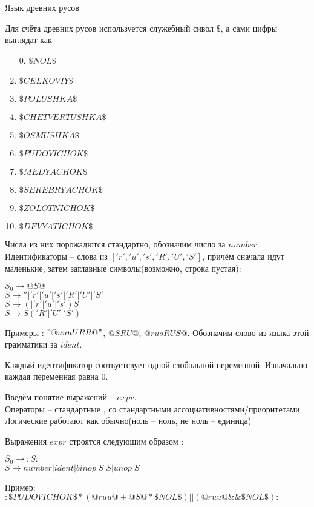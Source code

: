 \documentclass[12pt]{article}
\begin{document}
\begin{center} {\LARGE Язык древних русов} \end{center}

\bigskip


Для счёта древних русов используется служебный сивол $\$$, а сами цифры выглядат как
\begin{enumerate}
\item[0.] $\$NOL\$$
\item $\$CELKOVIY\$$
\item $\$POLUSHKA\$$
\item $\$CHETVERTUSHKA\$$
\item $\$OSMUSHKA\$$
\item $\$PUDOVICHOK\$$
\item $\$MEDYACHOK\$$
\item $\$SEREBRYACHOK\$$
\item $\$ZOLOTNICHOK\$$
\item $\$DEVYATICHOK\$$
\end{enumerate}

Числа из них порожадются стандартно, обозначим число за $number$.\\



Идентификаторы -- слова из $['r', 'u', 's', 'R', 'U', 'S']$, причём сначала идут маленькие, затем заглавные символы(возможно, строка пустая):

\begin{myquote}
$S_0 \to @S@$\\
$S \to ''|'r'|'u'|'s'|'R'|'U'|'S'$\\
$S \to (|'r'|'u'|'s')S$\\
$S \to S('R'|'U'|'S')$
\end{myquote}

Примеры : $"@uuuURR@"$, $@SRU@$, $@rusRUS@$.
Обозначим слово из языка этой грамматики за $ident$.

Каждый идентификатор соотвуетсвует одной глобальной переменной. Изначально каждая переменная равна $0$.


Введём понятие выражений -- $expr$.\\

Операторы -- стандартные , со стандартными ассоциативностями/приоритетами. \\
Логические работают как обычно(ноль -- ноль, не ноль -- единица)

Выражения $expr$ строятся следующим образом :
\begin{myquote}
$S_0 \to :S:$\\
$S \to number | ident| binop\; S\; S| unop\; S $
\end{myquote}
Пример: $:\$PUDOVICHOK\$ * (@ruu@ + @S@ * \$NOL\$)||(@ruu@ \&\& \$NOL\$):$\\
\end{document}
